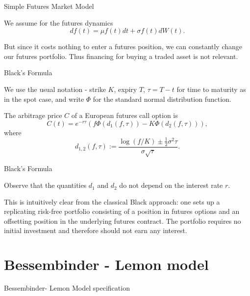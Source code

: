 {Simple Futures Market Model}






	We assume for the futures dynamics
$$
df(t) = \mu f(t) dt + \sigma f(t) dW(t).
$$


	But since it costs nothing to enter a futures position, we can constantly change our futures portfolio.
Thus financing for buying a traded asset is not relevant.





{Black's Formula}







	We use the usual notation -
strike $K$, expiry $T$, $\tau=T-t$ for time to maturity as in the spot case, and write $\Phi$ for the
standard normal distribution function.


	
The arbitrage price $C$ of a European futures call option is
\begin{equation}\label{Black}
C(t)= e^{-r\tau} (f \Phi(d_1 (f,\tau)) - K \Phi(d_2 (f,\tau))),
\end{equation}
where
$$
d_{1,2} (f,\tau) := \frac{\log (f/K) \pm \frac{1}{2} {\sigma}^2 \tau}{
\sigma \sqrt{\tau}}.
$$





{Black's Formula}






	
Observe that the quantities $d_1$ and $d_2$ do not depend on the
interest rate $r$.


	This is intuitively clear from the classical
Black approach: one sets up a replicating risk-free portfolio
consisting of a position in futures options and an offsetting
position in the underlying futures contract. The portfolio
requires no initial investment and therefore should not earn any
interest.





\section{Bessembinder - Lemon model}

{Bessembinder- Lemon Model specification}


